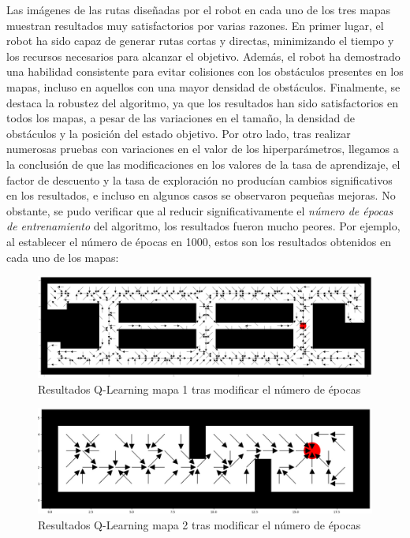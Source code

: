 \documentclass[conference,a4paper]{IEEEtran}
\begin{document}
Las imágenes de las rutas diseñadas por el robot en cada uno de los tres mapas muestran resultados muy satisfactorios por varias razones.
En primer lugar, el robot ha sido capaz de generar rutas cortas y directas, minimizando el tiempo y los recursos necesarios para alcanzar el objetivo.
Además, el robot ha demostrado una habilidad consistente para evitar colisiones con los obstáculos presentes en los mapas, incluso en aquellos con una mayor densidad de obstáculos. Finalmente, se destaca la robustez del algoritmo, 
ya que los resultados han sido satisfactorios en todos los mapas, a pesar de las variaciones en el tamaño, la densidad de obstáculos y la posición del estado objetivo.
Por otro lado, tras realizar numerosas pruebas con variaciones en el valor de los hiperparámetros, llegamos a la conclusión de que las modificaciones en los valores de la tasa de aprendizaje, el factor de descuento y la tasa de exploración no producían cambios significativos en los resultados,
e incluso en algunos casos se observaron pequeñas mejoras. No obstante, se pudo verificar que al reducir significativamente el \textit{número de épocas de entrenamiento} 
del algoritmo, los resultados fueron mucho peores. Por ejemplo, al establecer el número de épocas en 1000,
estos son los resultados obtenidos en cada uno de los mapas:

\begin{figure}[h]
  \centering
  \includegraphics[scale=0.33]{resultado_2_qlearning_mapa_1}
  \caption{Resultados Q-Learning mapa 1 tras modificar el número de épocas}
  \label{fig:resultado_2_qlearning_mapa_1}
\end{figure}

\begin{figure}[h]
  \centering
  \includegraphics[scale=0.33]{resultado_2_qlearning_mapa_2}
  \caption{Resultados Q-Learning mapa 2 tras modificar el número de épocas}
  \label{fig:resultado_2_qlearning_mapa_2}
\end{figure}
\end{document}
